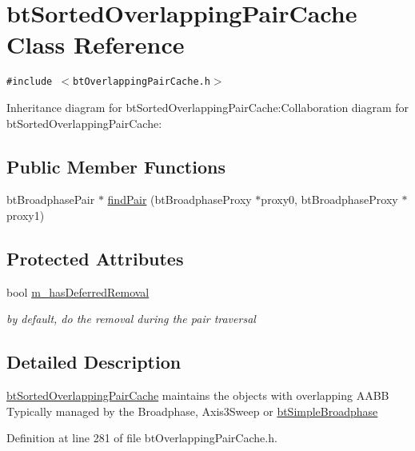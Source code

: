 \hypertarget{classbt_sorted_overlapping_pair_cache}{
\section{btSortedOverlappingPairCache Class Reference}
\label{classbt_sorted_overlapping_pair_cache}
}
{\tt \#include $<$btOverlappingPairCache.h$>$}

Inheritance diagram for btSortedOverlappingPairCache:Collaboration diagram for btSortedOverlappingPairCache:\subsection*{Public Member Functions}
\begin{CompactItemize}
\item 
btBroadphasePair $\ast$ \hyperlink{classbt_sorted_overlapping_pair_cache_73b6665ffd9874f0575b72d07761ce8d}{findPair} (btBroadphaseProxy $\ast$proxy0, btBroadphaseProxy $\ast$proxy1)
\end{CompactItemize}
\subsection*{Protected Attributes}
\begin{CompactItemize}
\item 
\hypertarget{classbt_sorted_overlapping_pair_cache_af79926dc15005b65c34248053af42b9}{
bool \hyperlink{classbt_sorted_overlapping_pair_cache_af79926dc15005b65c34248053af42b9}{m\_\-hasDeferredRemoval}}
\label{classbt_sorted_overlapping_pair_cache_af79926dc15005b65c34248053af42b9}

\begin{CompactList}\small\item\em by default, do the removal during the pair traversal \item\end{CompactList}\end{CompactItemize}


\subsection{Detailed Description}
\hyperlink{classbt_sorted_overlapping_pair_cache}{btSortedOverlappingPairCache} maintains the objects with overlapping AABB Typically managed by the Broadphase, Axis3Sweep or \hyperlink{classbt_simple_broadphase}{btSimpleBroadphase} 

Definition at line 281 of file btOverlappingPairCache.h.

